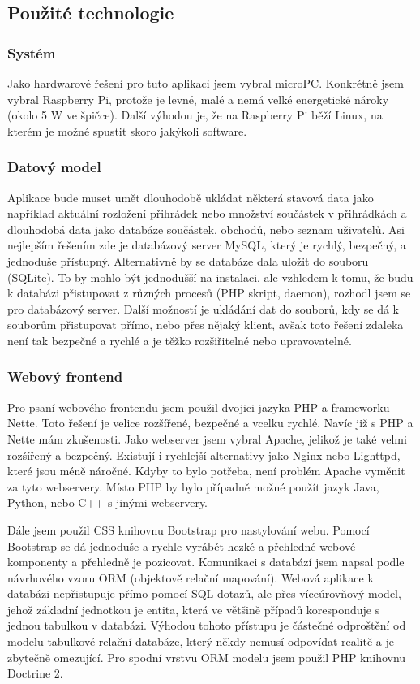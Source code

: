 \documentclass[12pt, a4paper, oneside]{article}
\begin{document}
\subsection{Použité technologie}

\subsubsection{Systém}

Jako hardwarové řešení pro tuto aplikaci jsem vybral microPC. Konkrétně jsem vybral Raspberry Pi, protože je levné, malé a nemá velké energetické nároky (okolo 5 W ve špičce).
Další výhodou je, že na Raspberry Pi běží Linux, na kterém je možné spustit skoro jakýkoli software.

\subsubsection{Datový model}

Aplikace bude muset umět dlouhodobě ukládat některá stavová data jako například aktuální rozložení přihrádek
nebo množství součástek v přihrádkách a dlouhodobá data jako databáze součástek, obchodů, nebo seznam uživatelů.
Asi nejlepším řešením zde je databázový server MySQL, který je rychlý, bezpečný, a jednoduše přístupný.
Alternativně by se databáze dala uložit do souboru (SQLite). To by mohlo být jednodušší na instalaci, ale vzhledem k tomu, že budu k databázi přistupovat z různých procesů (PHP skript, daemon), rozhodl jsem se pro databázový server.
Další možností je ukládání dat do souborů, kdy se dá k souborům přistupovat přímo, nebo přes nějaký klient,
avšak toto řešení zdaleka není tak bezpečné a rychlé a je těžko rozšiřitelné nebo upravovatelné.

\subsubsection{Webový frontend}

Pro psaní webového frontendu jsem použil dvojici jazyka PHP a frameworku Nette.
Toto řešení je velice rozšířené, bezpečné a vcelku rychlé. Navíc již s PHP a Nette mám zkušenosti.
Jako webserver jsem vybral Apache, jelikož je také velmi rozšířený a bezpečný.
Existují i rychlejší alternativy jako Nginx nebo Lighttpd, které jsou méně náročné.
Kdyby to bylo potřeba, není problém Apache vyměnit za tyto webservery.
Místo PHP by bylo případně možné použít jazyk Java, Python, nebo C++ s jinými webservery.

Dále jsem použil CSS knihovnu Bootstrap pro nastylování webu. Pomocí Bootstrap se dá jednoduše a rychle vyrábět hezké a přehledné webové komponenty a přehledně je pozicovat.
Komunikaci s databází jsem napsal podle návrhového vzoru ORM (objektově relační mapování). Webová aplikace k databázi nepřistupuje přímo pomocí SQL dotazů, ale přes víceúrovňový model, jehož základní jednotkou je entita, která ve většině případů koresponduje s jednou tabulkou v databázi. Výhodou tohoto přístupu je částečné odproštění od modelu tabulkové relační databáze, který někdy nemusí odpovídat realitě a je zbytečně omezující. Pro spodní vrstvu ORM modelu jsem použil PHP knihovnu Doctrine 2.  
\end{document}
